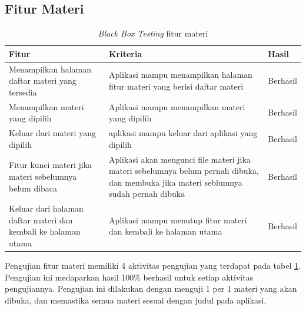 \subsection{Fitur Materi}
\begin{table}[H]
	\centering
	\caption{\textit{Black Box Testing} fitur materi}
	\label{Tab:blackBoxMateri}
	\begin{tabular}{|p{}|p{}|p{}|}
		\hline
		 \centering\textbf{Fitur} & \multicolumn{1}{m{0.45\textwidth}|}{\centering \textbf{Kriteria}}&  \multicolumn{1}{m{0.1\textwidth}|}{\centering \textbf{Hasil}}\\
		\hline
		Menampilkan halaman daftar materi yang tersedia
		& Aplikasi mampu menampilkan halaman fitur materi yang berisi daftar materi
		& Berhasil\\
		\hline
		Menampilkan materi yang dipilih
		& Aplikasi mampu menampilkan materi yang dipilih
		& Berhasil\\
		\hline
		Keluar dari materi yang dipilih
		& aplikasi mampu keluar dari aplikasi yang dipilih
		& Berhasil\\
		\hline
		Fitur kunci materi jika materi sebelumnya belum dibaca
		& Aplikasi akan mengunci file materi jika materi sebelumnya belum pernah dibuka, dan membuka jika materi seblumnya sudah pernah dibuka
		& Berhasil\\
		\hline
		Keluar dari halaman daftar materi dan kembali ke halaman utama
		& Aplikasi mampu menutup fitur materi dan kembali ke halaman utama
		& Berhasil\\
		\hline
	\end{tabular}
\end{table}
Pengujian fitur materi memiliki 4 aktivitas pengujian yang terdapat pada tabel \ref*{Tab:blackBoxMateri}.
Pengujian ini medaparkan hasil 100\% berhasil untuk setiap aktivitas pengujiannya.
Pengujian ini dilakukan dengan menguji 1 per 1 materi yang akan dibuka, dan memastika semua materi sesuai dengan judul pada aplikasi.
